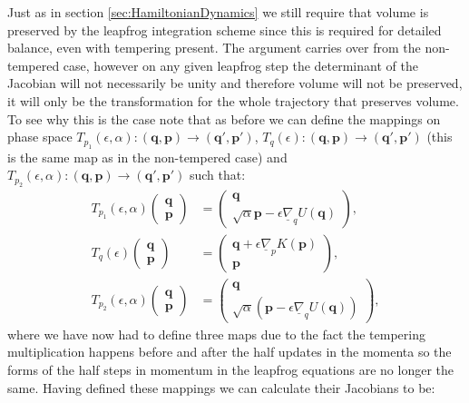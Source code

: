\documentclass[12pt]{article}
\begin{document}
    Just as in section \ref{sec:HamiltonianDynamics} we still require that volume is preserved by the leapfrog integration scheme since this is required for detailed balance, even with tempering present. The argument carries over from the non-tempered case, however on any given leapfrog step the determinant of the Jacobian will not necessarily be unity and therefore volume will not be preserved, it will only be the transformation for the whole trajectory that preserves volume. To see why this is the case note that as before we can define the mappings on phase space $T_{p_1}\left(\epsilon,\alpha\right): \left(\bm{q},\bm{p}\right) \rightarrow \left(\bm{q}',\bm{p}'\right)$, $T_{q}\left(\epsilon\right): \left(\bm{q},\bm{p}\right) \rightarrow \left(\bm{q}',\bm{p}'\right)$ (this is the same map as in the non-tempered case) and $T_{p_2}\left(\epsilon,\alpha\right): \left(\bm{q},\bm{p}\right) \rightarrow \left(\bm{q}',\bm{p}'\right)$ such that:
    \begin{align}
        T_{p_1}\left(\epsilon,\alpha\right)\begin{pmatrix} \bm{q} \\ \bm{p} \end{pmatrix} & = \begin{pmatrix} \bm{q} \\ \sqrt{\alpha}\bm{p} - \epsilon \underline{\nabla}_{q}U\left(\bm{q}\right)\end{pmatrix},\\
        T_{q}\left(\epsilon\right)\begin{pmatrix} \bm{q} \\ \bm{p} \end{pmatrix} & = \begin{pmatrix} \bm{q} + \epsilon \underline{\nabla}_pK\left(\bm{p}\right)  \\ \bm{p} \end{pmatrix},\\
        T_{p_2}\left(\epsilon,\alpha\right)\begin{pmatrix} \bm{q} \\ \bm{p} \end{pmatrix} & = \begin{pmatrix} \bm{q} \\ \sqrt{\alpha}\left(\bm{p} - \epsilon \underline{\nabla}_qU\left(\bm{q}\right)\right)\end{pmatrix},
    \end{align}
    where we have now had to define three maps due to the fact the tempering multiplication happens before and after the half updates in the momenta so the forms of the half steps in momentum in the leapfrog equations are no longer the same. Having defined these mappings we can calculate their Jacobians to be:
\end{document}
